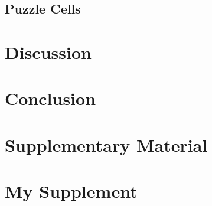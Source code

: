 \subsection{Puzzle Cells}

\section{Discussion}

\section{Conclusion}


\newpage
\printbibliography

\newpage
\section*{Supplementary Material}

\renewcommand{\thesection}{S\arabic{section}}
\setcounter{section}{0}

\section{My Supplement}

\newpage
\thispagestyle{empty}



